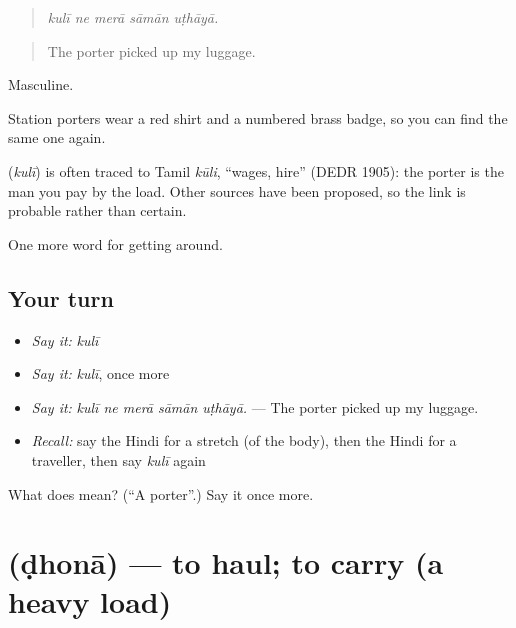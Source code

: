 \begin{quote}
    
\end{quote}

\begin{quote}
\emph{kulī ne merā sāmān uṭhāyā.}
\end{quote}

\begin{quote}
The porter picked up my luggage.
\end{quote}

Masculine.

Station porters wear a red shirt and a numbered brass badge, so you can find the same one again.

\begin{cousinweb}
\textbf{} (\emph{kulī}) is often traced to Tamil \emph{kūli}, \textquotedblleft{}wages, hire\textquotedblright{} (DEDR 1905): the porter is the man you pay by the load. Other sources have been proposed, so the link is probable rather than certain.
\end{cousinweb}

\begin{grammarlens}[title={What you've built}]
One more word for getting around.
\end{grammarlens}

\subsection*{Your turn}
\begin{itemize}
\raggedright
  \item \emph{Say it:} \emph{kulī}
  \item \emph{Say it:} \emph{kulī}, once more
  \item \emph{Say it:} \emph{kulī ne merā sāmān uṭhāyā.} — The porter picked up my luggage.
  \item \emph{Recall:} say the Hindi for a stretch (of the body), then the Hindi for a traveller, then say \emph{kulī} again
\end{itemize}

\begin{tcolorbox}[breakable,colback=teal!4,colframe=teal!35!black,title={Before you move on}]
What does  mean? (\textquotedblleft{}A porter\textquotedblright{}.) Say it once more.
\end{tcolorbox}
\section[\texorpdfstring{\hi{ढोना} (ḍhonā)}{ढोना (ḍhonā)}]{ (ḍhonā) — to haul; to carry (a heavy load)}

